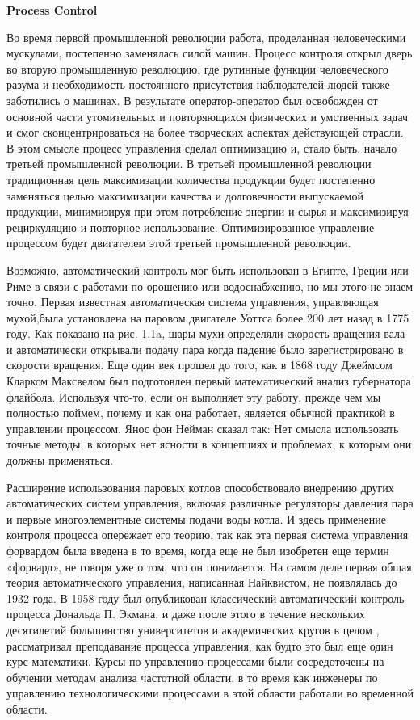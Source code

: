 \documentclass[aps,
12pt,
final,
oneside,
onecolumn,
musixtex, 
superscriptaddress,
centertags]{article}
\begin{document}
\begin{center}
\textbf{\Large Process Control} \\[1.0 cm]
\end{center}


Во время первой промышленной революции работа, проделанная человеческими мускулами, постепенно заменялась силой машин. Процесс контроля открыл дверь во вторую промышленную революцию, где рутинные функции человеческого разума и необходимость постоянного присутствия наблюдателей-людей также заботились о машинах. В результате оператор-оператор был освобожден от основной части утомительных и повторяющихся физических и умственных задач и смог сконцентрироваться на более творческих аспектах действующей отрасли. В этом смысле процесс управления сделал оптимизацию и, стало быть, начало третьей промышленной революции. В третьей промышленной революции традиционная цель максимизации количества продукции будет постепенно заменяться целью максимизации качества и долговечности выпускаемой продукции, минимизируя при этом потребление энергии и сырья и максимизируя рециркуляцию и повторное использование. Оптимизированное управление процессом будет двигателем этой третьей промышленной революции.

Возможно, автоматический контроль мог быть использован в Египте, Греции или Риме в связи с работами по орошению или водоснабжению, но мы этого не знаем точно. Первая известная автоматическая система управления, управляющая мухой,была установлена на паровом двигателе Уоттса более 200 лет назад в 1775 году.
Как показано на рис. 1.1a, шары мухи определяли скорость вращения вала и автоматически открывали подачу пара когда падение было зарегистрировано в скорости вращения. Еще один век прошел до того, как в 1868 году Джеймсом Кларком Максвелом был подготовлен первый математический анализ губернатора флайбола. 
Используя что-то, если он выполняет эту работу, прежде чем мы полностью поймем, почему и как она работает, является обычной практикой в управлении процессом. Янос фон Нейман сказал так: Нет смысла использовать точные методы, в которых нет ясности в концепциях и проблемах, к которым они должны применяться.

Расширение использования паровых котлов способствовало внедрению других автоматических систем управления, включая различные регуляторы давления пара и первые многоэлементные системы подачи воды котла. И здесь применение контроля процесса опережает его теорию, так как эта первая система управления форвардом была введена в то время, когда еще не был изобретен еще термин «форвард», не говоря уже о том, что он понимается. На самом деле первая общая теория автоматического управления, написанная Найквистом, не появлялась до 1932 года. В 1958 году был опубликован классический автоматический контроль процесса Дональда П. Экмана, и даже после этого в течение нескольких десятилетий большинство университетов и академических кругов в целом , рассматривал преподавание процесса управления, как будто это был еще один курс математики. Курсы по управлению процессами были сосредоточены на обучении методам анализа частотной области, в то время как инженеры по управлению технологическими процессами в этой области работали во временной области.
\end{document}
